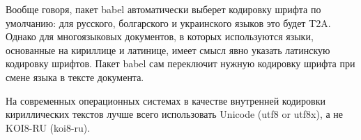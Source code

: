 \documentclass{article}
\begin{document}
	Вообще говоря, пакет babel автоматически выберет кодировку шрифта по умолчанию: для русского, болгарского и украинского языков это будет T2A. Однако для многоязыковых документов, в которых используются языки, основанные на кириллице и латинице, имеет смысл явно указать латинскую кодировку шрифтов. Пакет babel сам переключит нужную кодировку шрифта при смене языка в тексте документа.

	На современных операционных системах в качестве внутренней кодировки кириллических текстов лучше всего использовать Unicode (utf8 or utf8x), а не KOI8-RU (koi8-ru).
\end{document}
